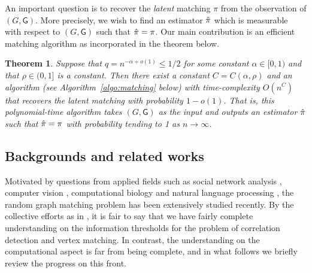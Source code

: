 \documentclass[11pt]{article}
\newtheorem{Theorem}{Theorem}[section]
\numberwithin{equation}{section}
\begin{document}
An important question is to recover the \emph{latent} matching $\pi$ from the observation of $(G, \mathsf G)$. More precisely, we wish to find an estimator $\Hat \pi$ which is measurable with respect to $(G, \mathsf G)$ such that $\Hat \pi = \pi$. Our main contribution is an efficient matching algorithm as incorporated in the theorem below.
\begin{Theorem}{\label{Main-Thm}}
Suppose that $q = n^{-\alpha + o(1)} \leq 1/2$ for some constant $\alpha\in [0, 1)$ and that $\rho\in (0, 1]$ is a constant. Then there exist a constant $C=C(\alpha,\rho)$ and an algorithm (see Algorithm~\ref{algo:matching} below) with time-complexity $O(n^{C})$ that recovers the latent matching with probability $1-o(1)$. That is, this polynomial-time algorithm takes $(G, \mathsf G)$ as the input and outputs an estimator $\Hat{\pi}$ such that $\Hat{\pi} = \pi$ with probability tending to 1 as $n\to \infty$.
\end{Theorem}


\subsection{Backgrounds and related works}

Motivated by questions from applied fields such as social network analysis \cite{NS08,NS09}, computer vision \cite{CSS07,BBM05}, computational biology \cite{SXB08,VCP15} and natural language processing \cite{HNM05}, the random graph matching problem has been extensively studied recently. By the collective efforts  as in \cite{CK16, CK17, HM20, WXY20+,WXY21+, GML21, DD22+, DD22+b}, it is fair to say that we have fairly complete understanding on the information thresholds for the problem of correlation detection and vertex matching. In contrast, the understanding on the computational aspect is far from being complete, and in what follows we briefly review the progress on this front.
\end{document}
